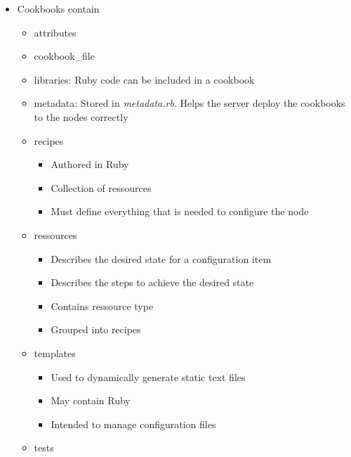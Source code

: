 \begin{itemize}
		\item Cookbooks contain
			\begin{itemize}
				\item attributes
				\item cookbook\_file
				\item libraries: Ruby code can be included in a cookbook
				\item metadata: Stored in \textit{metadata.rb}. Helps the server deploy the cookbooks to the nodes correctly
				\item recipes
					\begin{itemize}
						\item Authored in Ruby
						\item Collection of ressources
						\item Must define everything that is needed to configure the node
					\end{itemize}
				\item ressources
					\begin{itemize}
						\item Describes the desired state for a configuration item
						\item Describes the steps to achieve the desired state
						\item Contains ressource type
						\item Grouped into recipes
					\end{itemize}
				\item templates
					\begin{itemize}
						\item Used to dynamically generate static text files
						\item May contain Ruby
						\item Intended to manage configuration files
					\end{itemize}
				\item tests
			\end{itemize}
	\end{itemize}
